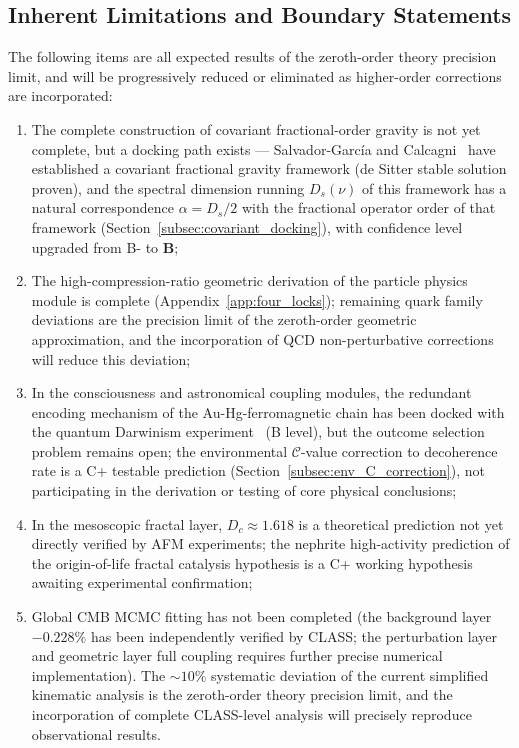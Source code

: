 \documentclass[12pt,a4paper,twocolumn]{article}
\begin{document}
\subsection{Inherent Limitations and Boundary Statements}
The following items are all expected results of the zeroth-order theory precision limit, and will be progressively reduced or eliminated as higher-order corrections are incorporated:
\begin{enumerate}
\item The complete construction of covariant fractional-order gravity is not yet complete, but a docking path exists --- Salvador-Garc\'ia and Calcagni~\cite{SalvadorGarcia2026} have established a covariant fractional gravity framework (de Sitter stable solution proven), and the spectral dimension running $D_s(\nu)$ of this framework has a natural correspondence $\alpha = D_s/2$ with the fractional operator order of that framework (Section~\ref{subsec:covariant_docking}), with confidence level upgraded from B- to \textbf{B};
\item The high-compression-ratio geometric derivation of the particle physics module is complete (Appendix~\ref{app:four_locks}); remaining quark family deviations are the precision limit of the zeroth-order geometric approximation, and the incorporation of QCD non-perturbative corrections will reduce this deviation;
\item In the consciousness and astronomical coupling modules, the redundant encoding mechanism of the Au-Hg-ferromagnetic chain has been docked with the quantum Darwinism experiment~\cite{Zhu2025} (B level), but the outcome selection problem remains open; the environmental $\mathcal{C}$-value correction to decoherence rate is a C+ testable prediction (Section~\ref{subsec:env_C_correction}), not participating in the derivation or testing of core physical conclusions;
\item In the mesoscopic fractal layer, $D_c\approx1.618$ is a theoretical prediction not yet directly verified by AFM experiments; the nephrite high-activity prediction of the origin-of-life fractal catalysis hypothesis is a C+ working hypothesis awaiting experimental confirmation;
\item Global CMB MCMC fitting has not been completed (the background layer $-0.228\%$ has been independently verified by CLASS; the perturbation layer and geometric layer full coupling requires further precise numerical implementation). The $\sim\!10\%$ systematic deviation of the current simplified kinematic analysis is the zeroth-order theory precision limit, and the incorporation of complete CLASS-level analysis will precisely reproduce observational results.
\end{enumerate}
\end{document}
